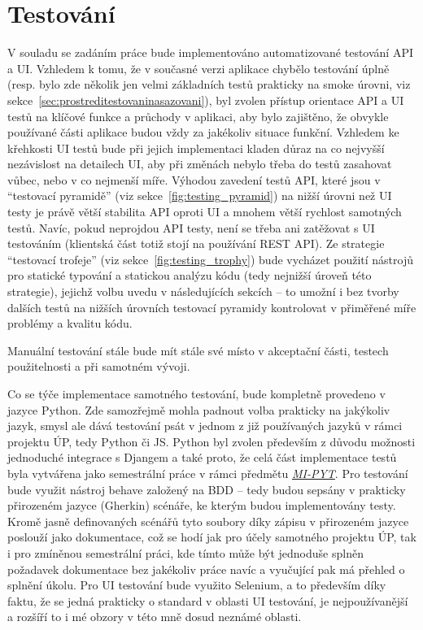 \section{Testování}

V souladu se zadáním práce bude implementováno automatizované testování API a UI. Vzhledem k tomu, že v současné verzi aplikace chybělo testování úplně (resp. bylo zde několik jen velmi základních testů prakticky na smoke úrovni, viz sekce~\ref{sec:prostreditestovaninasazovani}), byl zvolen přístup orientace API a UI testů na klíčové funkce a průchody v aplikaci, aby bylo zajištěno, že obvykle používané části aplikace budou vždy za jakékoliv situace funkční. Vzhledem ke křehkosti UI testů bude při jejich implementaci kladen důraz na co nejvyšší nezávislost na detailech UI, aby při změnách nebylo třeba do testů zasahovat vůbec, nebo v co nejmenší míře. Výhodou zavedení testů API, které jsou v \enquote{testovací pyramidě} (viz sekce~\ref{fig:testing_pyramid}) na nižší úrovni než UI testy je právě větší stabilita API oproti UI a mnohem větší rychlost samotných testů. Navíc, pokud neprojdou API testy, není se třeba ani zatěžovat s UI testováním (klientská část totiž stojí na používání REST API). Ze strategie \enquote{testovací trofeje} (viz sekce~\ref{fig:testing_trophy}) bude vycházet použití nástrojů pro statické typování a statickou analýzu kódu (tedy nejnižší úroveň této strategie), jejichž volbu uvedu v následujících sekcích -- to umožní i bez tvorby dalších testů na nižších úrovních testovací pyramidy kontrolovat v přiměřené míře problémy a kvalitu kódu.

Manuální testování stále bude mít stále své místo v akceptační části, testech použitelnosti a při samotném vývoji.

Co se týče implementace samotného testování, bude kompletně provedeno v jazyce Python. Zde samozřejmě mohla padnout volba prakticky na jakýkoliv jazyk, smysl ale dává testování psát v jednom z již používaných jazyků v rámci projektu ÚP, tedy Python či JS. Python byl zvolen především z důvodu možnosti jednoduché integrace s Djangem a také proto, že celá část implementace testů byla vytvářena jako semestrální práce v rámci předmětu \textit{\href{https://courses.fit.cvut.cz/MI-PYT/}{MI-PYT}}. Pro testování bude využit nástroj behave založený na BDD -- tedy budou sepsány v prakticky přirozeném jazyce (Gherkin) scénáře, ke kterým budou implementovány testy. Kromě jasně definovaných scénářů tyto soubory díky zápisu v přirozeném jazyce poslouží jako dokumentace, což se hodí jak pro účely samotného projektu ÚP, tak i pro zmíněnou semestrální práci, kde tímto může být jednoduše splněn požadavek dokumentace bez jakékoliv práce navíc a vyučující pak má přehled o splnění úkolu. Pro UI testování bude využito Selenium, a to především díky faktu, že se jedná prakticky o standard v oblasti UI testování, je nejpoužívanější a rozšíří to i mé obzory v této mně dosud neznámé oblasti.

